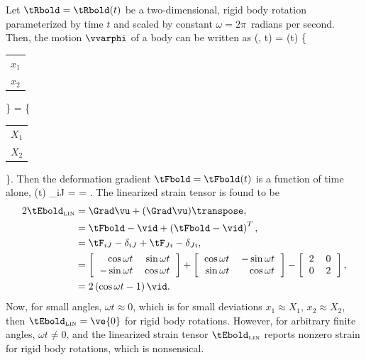 Let $\tRbold = \tRbold(t)$ be a two-dimensional, 
rigid body rotation parameterized by time $t$
and scaled by constant $\omega = 2 \pi$~radians per second.  
Then, the motion $\vvarphi$ of a body can be written as
\be
 \vvarphi(\vX, t) = \tRbold(t) \vX 
 \;\; \Longleftrightarrow \;\;
 \left\{
 \begin{tabular}{c}
 $x_1$ \\
 $x_2$
 \end{tabular}
 \right\}
 = 
 \left\{
 \begin{tabular}{c}
 $X_1$ \\
 $X_2$
 \end{tabular}
 \right\}.
\ee
Then the deformation gradient $\tFbold = \tFbold(t)$ is a function of time
alone,
\be
 \tFbold(t)
 \;\; \Longleftrightarrow \;\;
 \tF_{iJ} 
 = 
 \left[
 \begin{tabular}{rr}
 $\tF_{11}$ & $\tF_{12}$ \\
 $\tF_{21}$ & $\tF_{22}$ 
 \end{tabular}
 \right]
 =
 .
\ee
The linearized strain tensor is found to be 
\begin{align}
 2 \tEbold_{\tiny \mbox{LIN}}
 &= \Grad \vu + (\Grad \vu)\transpose, \\
 &= \tFbold - \vid + 
     \left(\tFbold - \vid \right)^T, \\
 &= \tF_{iJ} - \delta_{iJ} + \tF_{Ji} - \delta_{Ji}, \\ 
 &= 
 \left[
 \begin{tabular}{rr}
 $\cos \omega t$ & $\sin \omega t$ \\
 $-\sin \omega t$ & $\cos \omega t$ 
 \end{tabular}
 \right]
 +   
 \left[
 \begin{tabular}{rr}
 $\cos \omega t$ & $-\sin \omega t$ \\
 $\sin \omega t$ & $\cos \omega t$ 
 \end{tabular}
 \right]
 -   
 \left[
 \begin{tabular}{rr}
 $2$ & $0$ \\
 $0$ & $2$ 
 \end{tabular}
 \right], \\
 &=
 2 \left( \cos \omega t - 1 \right) \vid.
\end{align}
Now, for small angles, $\omega t \approx 0$, which is
for small deviations $x_1 \approx X_1$, $x_2 \approx X_2$, then
$\tEbold_{\tiny \mbox{LIN}} = \ve{0}$ for rigid body rotations.
However, for arbitrary finite angles, $\omega t \neq 0$,
and the linearized strain tensor
$\tEbold_{\tiny \mbox{LIN}}$ reports nonzero strain for rigid
body rotations, which is nonsensical.

